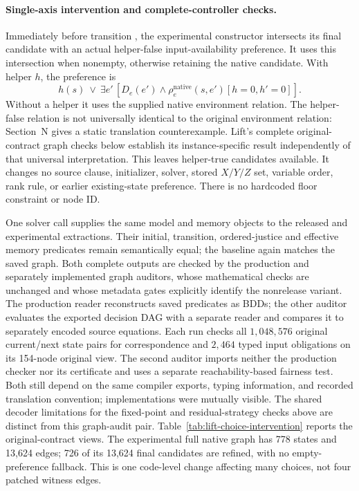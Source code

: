 \paragraph{Single-axis intervention and complete-controller checks.}
Immediately before transition , the experimental constructor
intersects its final candidate with an actual helper-false input-availability
preference. It uses this intersection when nonempty, otherwise retaining
the native candidate. With helper $h$, the preference is
\[
 h(s)\ \lor\
 \exists e'\,[D_e(e')\land
       \rho_e^{\mathrm{native}}(s,e')[h=0,h'=0]] .
\]
Without a helper it uses the supplied native environment relation.
The helper-false relation is not universally identical to the original
environment relation: Section~N gives a static translation counterexample.
Lift's complete original-contract graph checks below establish its
instance-specific result independently of that universal interpretation.
This leaves helper-true candidates available. It changes no source
clause, initializer, solver, stored $X/Y/Z$ set, variable order, rank
rule, or earlier existing-state preference. There is no hardcoded floor
constraint or node ID.

One solver call supplies the same model and memory objects to the
released and experimental extractions. Their initial, transition,
ordered-justice and effective memory predicates remain semantically
equal; the baseline again matches the saved graph. Both complete outputs
are checked by the production and separately implemented graph auditors,
whose mathematical checks are unchanged and whose metadata gates
explicitly identify the nonrelease variant.
The production reader reconstructs saved predicates as BDDs; the other
auditor evaluates the exported decision DAG with a separate reader and
compares it to separately encoded source equations. Each run checks all
$1{,}048{,}576$ original current/next state pairs for correspondence and
$2{,}464$ typed input obligations on its 154-node original view.
The second auditor imports neither the production checker nor its
certificate and uses a separate reachability-based fairness test.
Both still depend on the same compiler exports, typing information,
and recorded translation convention; implementations were mutually
visible. The shared decoder limitations for the fixed-point and
residual-strategy checks above are distinct from this graph-audit pair.
Table~\ref{tab:lift-choice-intervention} reports the original-contract
views. The experimental full native graph has 778 states and 13,624
edges; 726 of its 13,624 final candidates are refined, with no
empty-preference fallback. This is one code-level change affecting many
choices, not four patched witness edges.

